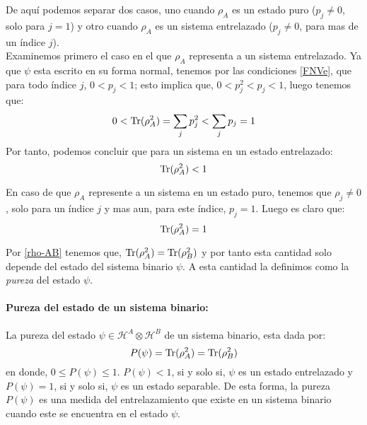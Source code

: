 \documentclass[12pt]{book}
\numberwithin{equation}{chapter}
\def\H{\mathcal{H}}
\def\pr{\otimes}
\def\Tr{\hbox{Tr}}
\begin{document}
De aqu\'i podemos separar dos casos, uno cuando $\rho_{A}$ es un estado puro ($p_{j} \neq 0$, solo para $j=1$) y otro cuando $\rho_{A}$ es un sistema entrelazado ($p_{j} \neq 0$, para mas de un \'indice $j$).\\

Examinemos primero el caso en el que $\rho_{A}$ representa a un sistema entrelazado. Ya que $\psi$ esta escrito en su forma normal, tenemos por las condiciones \eqref{FNVe}, que para todo \'indice $j$, $0 < p_{j} < 1$; esto implica que, $ 0 < p_{j}^{2} < p_{j} <1 $, luego tenemos que:
\begin{equation}
0< \Tr ( \rho_{A}^{2} )= \sum_{j} p_{j}^{2} < \sum_{j} p_{j}= 1
\end{equation}
Por tanto, podemos concluir que para un sistema en un estado entrelazado:
\begin{equation}
\Tr ( \rho_{A}^{2} ) < 1
\end{equation}

En caso de que $\rho_{A}$ represente a un sistema en un estado puro, tenemos que $ \rho_{j} \neq 0  $, solo para un \'indice $j$ y mas aun, para este \'indice, $p_{j}=1$. Luego es claro que:
\begin{equation}
\Tr (\rho_{A}^{2}) =1
\end{equation}

Por \eqref{rho-AB} tenemos que, $\Tr (\rho_{A}^{2}) = \Tr (\rho_{B}^{2})$ y por tanto esta cantidad solo depende del estado del sistema binario $\psi$. A esta cantidad la definimos como la \emph{pureza} del estado $\psi$.

\paragraph{Pureza del estado de un sistema binario:}
La pureza del estado $\psi \in \H^{A} \pr \H^{B}$ de un sistema binario, esta dada por:
\begin{equation}\label{pur-ps}
P(\psi)= \Tr(\rho_{A}^{2})= \Tr(\rho_{B}^{2})
\end{equation}
en donde, $0 \leq P(\psi) \leq 1$. $P(\psi) < 1$, si y solo si, $\psi$ es un estado entrelazado y $ P(\psi)=1 $, si y solo si, $\psi$ es un estado separable. De esta forma, la pureza $P(\psi)$ es una medida del entrelazamiento que existe en un sistema binario cuando este se encuentra en el estado $\psi$.

\rightline{$\dag$}
\vspace{5 mm}
\end{document}
